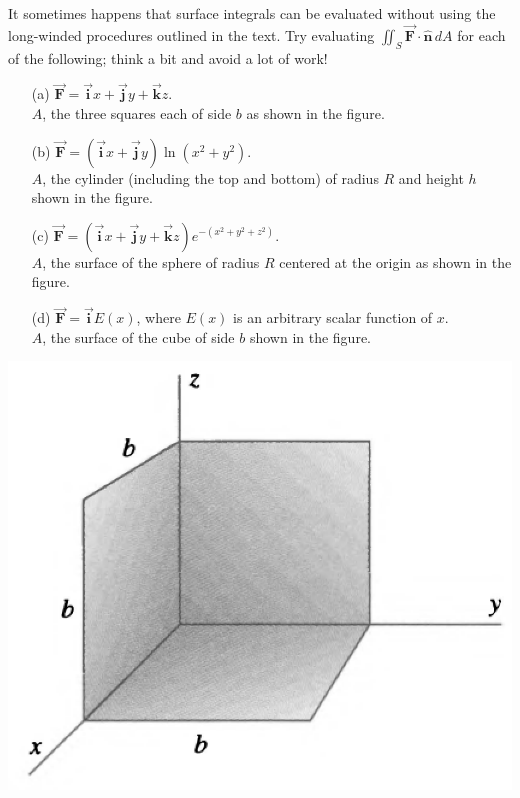 \documentclass[11pt,letterpaper,boxed]{hmcpset}
\begin{document}
	\begin{problem}[Schey II-10] 
		It sometimes happens that surface integrals can be evaluated without using the long-winded procedures outlined in the text. Try evaluating $\iint_S \vec{\textbf{F}} \cdot \hat{\textbf{n}}\,dA$ for each of the following; think a bit and avoid a lot of work!
		
		\begin{enumerate}
			\item [(a)] $\vec{\textbf{F}} = \vec{\textbf{i}}x + \vec{\textbf{j}}y + \vec{\textbf{k}}z$. 
				\\$A$, the three squares each of side $b$ as shown in the figure.
			\item [(b)] $\vec{\textbf{F}} = (\vec{\textbf{i}}x + \vec{\textbf{j}}y)\ln(x^2+y^2)$. 
				\\$A$, the cylinder (including the top and bottom) of radius $R$ and height $h$ shown in the figure.
			\item [(c)] $\vec{\textbf{F}} = (\vec{\textbf{i}}x + \vec{\textbf{j}}y + \vec{\textbf{k}}z)e^{-(x^2+y^2+z^2)}$. 
				\\$A$, the surface of the sphere of radius $R$ centered at the origin as shown in the figure.
			\item[(d)] $\vec{\textbf{F}} = \vec{\textbf{i}}E(x)$, where $E(x)$ is an arbitrary scalar function of $x$.
				\\$A$, the surface of the cube of side $b$ shown in the figure.
		\end{enumerate}
		\begin{center}
			\includegraphics[scale=0.25]{II-10a.png}

\end{center}
\end{problem}
\end{document}
